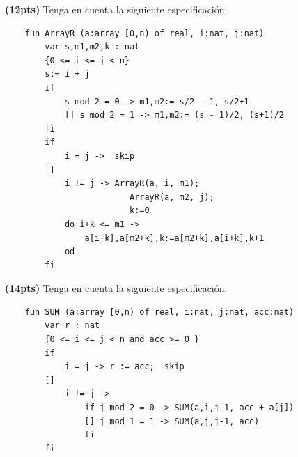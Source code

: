 \documentclass[12pt, a4paper]{exam}
\begin{document}
\begin{questions}
	\pointsdroppedatright
	\question \textbf{(12pts)} Tenga en cuenta la siguiente especificación:
	\begin{lstlisting}
    fun ArrayR (a:array [0,n) of real, i:nat, j:nat)
        var s,m1,m2,k : nat
        {0 <= i <= j < n}
        s:= i + j
        if 
            s mod 2 = 0 -> m1,m2:= s/2 - 1, s/2+1
            [] s mod 2 = 1 -> m1,m2:= (s - 1)/2, (s+1)/2
        fi
        if
            i = j ->  skip
        [] 
            i != j -> ArrayR(a, i, m1);
                         ArrayR(a, m2, j);
                         k:=0
            do i+k <= m1 -> 
                a[i+k],a[m2+k],k:=a[m2+k],a[i+k],k+1
            od
        fi
    \end{lstlisting}
    \newpage
	\question \textbf{(14pts)} Tenga en cuenta la siguiente especificación:
	\begin{lstlisting}
    fun SUM (a:array [0,n) of real, i:nat, j:nat, acc:nat)
        var r : nat
        {0 <= i <= j < n and acc >= 0 }
        if
            i = j -> r := acc;  skip
        [] 
            i != j -> 
                if j mod 2 = 0 -> SUM(a,i,j-1, acc + a[j])
                [] j mod 1 = 1 -> SUM(a,j,j-1, acc)
                fi
        fi
    \end{lstlisting}
\end{questions}
\end{document}
